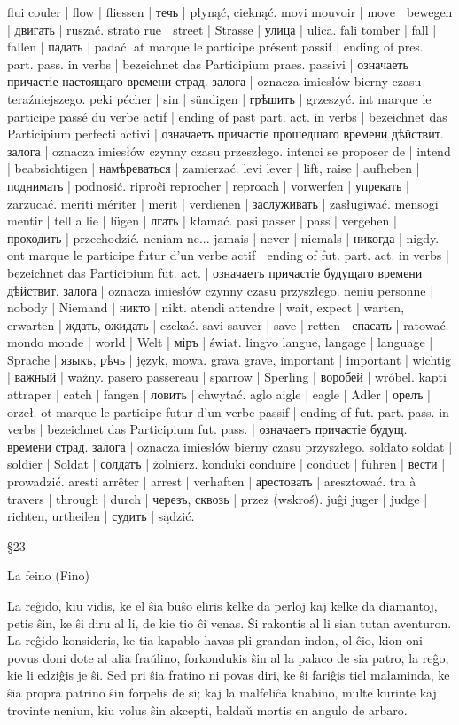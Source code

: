 flui couler | flow | fliessen | течь | płynąć, cieknąć.
movi mouvoir | move | bewegen | двигать | ruszać.
strato rue | street | Strasse | улица | ulica.
fali tomber | fall | fallen | падать | padać.
at marque le participe présent passif | ending of pres. part. pass. in verbs | bezeichnet das Participium praes. passivi | означаеть причастіе настоящаго времени страд. залога | oznacza imiesłów bierny czasu teraźniejszego.
peki pécher | sin | sündigen | грѣшить | grzeszyć.
int marque le participe passé du verbe actif | ending of past part. act. in verbs | bezeichnet das Participium perfecti activi | означаетъ причастіе прошедшаго времени дѣйствит. залога | oznacza imiesłów czynny czasu przeszłego.
intenci se proposer de | intend | beabsichtigen | намѣреваться | zamierzać.
levi lever | lift, raise | aufheben | поднимать | podnosić.
riproĉi reprocher | reproach | vorwerfen | упрекать | zarzucać.
meriti mériter | merit | verdienen | заслуживать | zasługiwać.
mensogi mentir | tell a lie | lügen | лгать | kłamać.
pasi passer | pass | vergehen | проходить | przechodzić.
neniam ne... jamais | never | niemals | никогда | nigdy.
ont marque le participe futur d’un verbe actif | ending of fut. part. act. in verbs | bezeichnet das Participium fut. act. | означаетъ причастіе будущаго времени дѣйствит. залога | oznacza imiesłów czynny czasu przyszłego.
neniu personne | nobody | Niemand | никто | nikt.
atendi attendre | wait, expect | warten, erwarten | ждать, ожидать | czekać.
savi sauver | save | retten | спасать | ratować.
mondo monde | world | Welt | міръ | świat.
lingvo langue, langage | language | Sprache | языкъ, рѣчь | język, mowa.
grava grave, important | important | wichtig | важный | ważny.
pasero passereau | sparrow | Sperling | воробей | wróbel.
kapti attraper | catch | fangen | ловить | chwytać.
aglo aigle | eagle | Adler | орелъ | orzeł.
ot marque le participe futur d’un verbe passif | ending of fut. part. pass. in verbs | bezeichnet das Participium fut. pass. | означаетъ причастіе будущ. времени страд. залога | oznacza imiesłów bierny czasu przyszłego.
soldato soldat | soldier | Soldat | солдатъ | żolnierz.
konduki conduire | conduct | führen | вести | prowadzić.
aresti arrêter | arrest | verhaften | арестовать | aresztować.
tra à travers | through | durch | черезъ, сквозь | przez (wskroś).
juĝi juger | judge | richten, urtheilen | судить | sądzić.

§23

La feino (Fino)

La reĝido, kiu vidis, ke el ŝia buŝo eliris kelke da perloj kaj kelke da diamantoj, petis ŝin, ke ŝi diru al li, de kie tio ĉi venas. Ŝi rakontis al li sian tutan aventuron. La reĝido konsideris, ke tia kapablo havas pli grandan indon, ol ĉio, kion oni povus doni dote al alia fraŭlino, forkondukis ŝin al la palaco de sia patro, la reĝo, kie li edziĝis je ŝi. Sed pri ŝia fratino ni povas diri, ke ŝi fariĝis tiel malaminda, ke ŝia propra patrino ŝin forpelis de si; kaj la malfeliĉa knabino, multe kurinte kaj trovinte neniun, kiu volus ŝin akcepti, baldaŭ mortis en angulo de arbaro.

